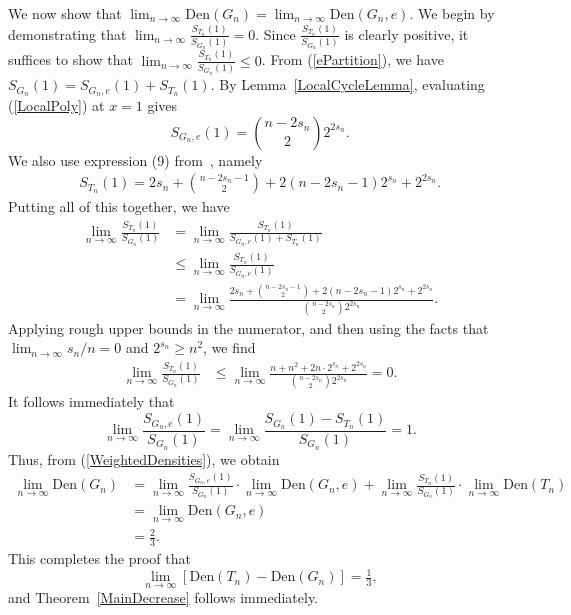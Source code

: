 \documentclass[12pt]{article}
\newcommand{\den}{\mbox{Den}}
\theoremstyle{definition}
\begin{document}
We now show that $\displaystyle\lim_{n\rightarrow \infty}\den(G_n)=\lim_{n\rightarrow\infty}\den(G_n,e).$
We begin by demonstrating that $\displaystyle\lim_{n\rightarrow \infty}\frac{S_{T_n}(1)}{S_{G_n}(1)}=0$.  Since $\displaystyle \frac{S_{T_n}(1)}{S_{G_n}(1)}$ is clearly positive, it suffices to show that $\displaystyle\lim_{n\rightarrow\infty}\frac{S_{T_n}(1)}{S_{G_n}(1)}\leq 0$.
From (\ref{ePartition}), we have $S_{G_n}(1)=S_{G_n,e}(1)+S_{T_n}(1)$.  By  Lemma~\ref{LocalCycleLemma}, evaluating (\ref{LocalPoly}) at $x=1$  gives
\[
S_{G_n,e}(1)=\binom{n-2s_n}{2}2^{2s_n}.
\]
We also use expression (9) from~\cite{MolOellermann2019}, namely
\begin{align}\label{Tn1}
S_{T_n}(1)=2s_n+\binom{n-2s_n-1}{2}+2(n-2s_n-1)2^{s_n}+2^{2s_n}.
\end{align}  
Putting all of this together, we have
\begin{align*}
    \lim_{n\rightarrow \infty}\frac{S_{T_n}(1)}{S_{G_n}(1)}&=\lim_{n\rightarrow \infty}\frac{S_{T_n}(1)}{S_{G_n,e}(1)+S_{T_n}(1)}\\
    &\leq \lim_{n\rightarrow\infty}\frac{S_{T_n}(1)}{S_{G_n,e}(1)}\\
    &=\lim_{n\rightarrow\infty}\frac{2s_n+\binom{n-2s_n-1}{2}+2(n-2s_n-1)2^{s_n}+2^{2s_n}}{\binom{n-2s_n}{2}2^{2s_n}}.
\end{align*}
Applying rough upper bounds in the numerator, and then using the facts that $\lim_{n\rightarrow\infty}s_n/n=0$ and $2^{s_n}\geq n^2$, we find
\begin{align}
    \lim_{n\rightarrow\infty}\frac{S_{T_n}(1)}{S_{G_n}(1)}&\leq \lim_{n\rightarrow\infty}\frac{n+n^2+2n\cdot 2^{s_n}+2^{2s_n}}{\binom{n-2s_n}{2}2^{2s_n}}=0.
\end{align}
It follows immediately that
\[
\lim_{n\rightarrow \infty}\frac{S_{G_n,e}(1)}{S_{G_n}(1)}=\lim_{n\rightarrow \infty}\frac{S_{G_n}(1)-S_{T_n}(1)}{S_{G_n}(1)}=1.
\]
Thus, from (\ref{WeightedDensities}), we obtain
\begin{align*}
    \lim_{n\rightarrow \infty}\den(G_n)&=\lim_{n\rightarrow \infty}\frac{S_{G_n,e}(1)}{S_{G_n}(1)}\cdot\lim_{n\rightarrow\infty}\den(G_n,e)+\lim_{n\rightarrow \infty}\frac{S_{T_n}(1)}{S_{G_n}(1)}\cdot\lim_{n\rightarrow\infty}\den(T_n)\\
    &=\lim_{n\rightarrow\infty}\den(G_n,e)\\
    &=\tfrac{2}{3}.
\end{align*}
This completes the proof that 
\[
\lim_{n\rightarrow\infty}\left[\den(T_n)-\den(G_n)\right]=\tfrac{1}{3},
\]
and Theorem~\ref{MainDecrease} follows immediately.
\end{document}
